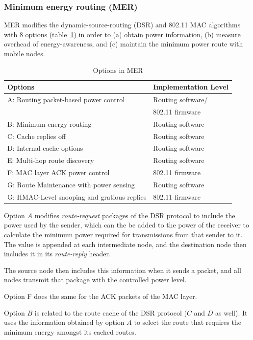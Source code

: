 \subsubsection{Minimum energy routing (MER)}
MER\cite{doshi2002demand} modifies the dynamic-source-routing (DSR)\cite{johnson1996dynamic}
and 802.11 MAC algorithms\cite{woesner1998power} with 8 options (table~\ref{tbl:mer-options}) in order to
(a) obtain power information, (b) measure overhead of energy-awareness, and
(c) maintain the minimum power route with mobile nodes.

\begin{table}[tb]
  \begin{tabular}{ll}
    Options & Implementation Level  \\
    \hline
    A: Routing packet-based power control & Routing software/\\ &802.11 firmware \\
    B: Minimum energy routing & Routing software \\
    C: Cache replies off & Routing software \\
    D: Internal cache options & Routing software \\
    E: Multi-hop route discovery & Routing software \\
    F: MAC layer ACK power control & 802.11 firmware \\
    G: Route Maintenance with power sensing & Routing software \\
    G: HMAC-Level snooping and gratious replies & 802.11 firmware \\
  \end{tabular}
  \caption{Options in MER}
  \label{tbl:mer-options}
\end{table}

Option $A$ modifies \textit{route-request} packages of the DSR protocol to
include the power used by the sender, which can the be added to the power
of the receiver to calculate the minimum power required for transmissions
from that sender to it. The value is appended at each intermediate node, and the
destination node then includes it in its \textit{route-reply} header.

The source node then includes this information when it sends a packet, and
all nodes transmit that package with the controlled power level.

Option F does the same for the ACK packets of the MAC layer.

Option $B$ is related to the route cache of the DSR protocol ($C$ and $D$ as well). It
uses the information obtained by option $A$ to select the route that requires
the minimum energy amongst its cached routes.

